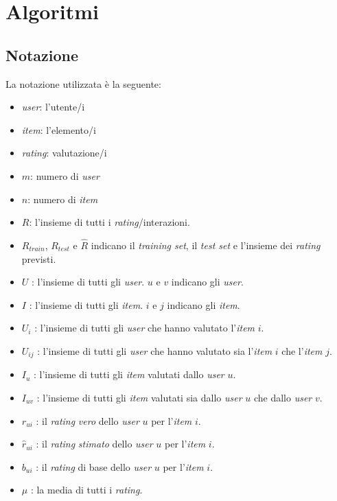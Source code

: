 \chapter{Algoritmi}\label{algoritmi}

\section{Notazione}\label{notazione}

La notazione utilizzata è la seguente:

\begin{itemize}
    \item \textit{user}: l'utente/i
    \item \textit{item}: l'elemento/i
    \item \textit{rating}: valutazione/i
    \item $m$: numero di \textit{user}
    \item $n$: numero di \textit{item}
    \item $R$: l'insieme di tutti i \textit{rating}/interazioni.
    \item $R_{train}$, $R_{test}$ e $\hat{R}$ indicano il \textit{training set}, il \textit{test set} e l'insieme dei \textit{rating} previsti.
    \item $U$ : l'insieme di tutti gli \textit{user}. $u$ e $v$ indicano gli \textit{user}.
    \item $I$ : l'insieme di tutti gli \textit{item}. $i$ e $j$ indicano gli \textit{item}.
    \item $U_i$ : l'insieme di tutti gli \textit{user} che hanno valutato l'\textit{item} $i$.
    \item $U_{ij}$ : l'insieme di tutti gli \textit{user} che hanno valutato sia l'\textit{item} $i$ che l'\textit{item} $j$.
    \item $I_u$ : l'insieme di tutti gli \textit{item} valutati dallo \textit{user} $u$.
    \item $I_{uv}$ : l'insieme di tutti gli \textit{item} valutati sia dallo \textit{user} $u$ che dallo \textit{user} $v$.
    \item $r_{ui}$ : il \textit{rating} \textit{vero} dello \textit{user} $u$ per l'\textit{item} $i$.
    \item $\hat{r}_{ui}$ : il \textit{rating} \textit{stimato} dello \textit{user} $u$ per l'\textit{item} $i$.
    \item $b_{ui}$ : il \textit{rating} di base dello \textit{user} $u$ per l'\textit{item} $i$.
    \item $\mu$ : la media di tutti i \textit{rating}.

\end{itemize}
